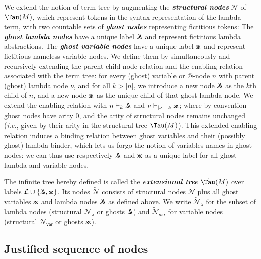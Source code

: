 \documentclass[xchauthor,chkrefs,GCNS,amsmath,amsthm,rotating,leaveRGB]{tcsg}
\renewcommand{\index}[1]{}
\theoremstyle{plain}
\theoremstyle{definition}
\newcommand{\Nodes}{\mathcal{N}}
\newcommand{\NodesVar}{\Nodes_{\mathsf{var}}}
\newcommand{\NodesLmd}{\Nodes_\lambda}
\newcommand{\ExtendedNodes}{\tilde{\Nodes}}
\newcommand{\ExtendedNodesVar}{\tilde{\Nodes}_{\mathsf{var}}}
\newcommand{\ExtendedNodesLmd}{\tilde{\Nodes}_{\lambda}}
\newcommand{\ghostlmd}{{\lambda\mkern-7mu \lambda}}
\newcommand{\ghostvar}{\mathsf{x\mkern-5mu x}}
\newcommand{\enables}{\vdash}
\newcommand{\ctree}{\Tau}
\newcommand{\exttree}{\tilde{\Tau}}
\begin{document}
We extend the notion of term tree by augmenting the \textbf{\emph{structural
nodes}}\index{structural nodes} $\Nodes $ of $\ctree (M)$, which represent
tokens in the syntax representation of the lambda term, with two countable
sets of \textbf{\emph{ghost nodes}}\index{ghost nodes} representing
fictitious tokens: The \textbf{\emph{ghost lambda nodes}}\index{ghost lambda
nodes}  have a unique label $\ghostlmd $ and represent fictitious lambda
abstractions. The \textbf{\emph{ghost variable nodes}}\index{ghost variable
nodes} have a unique label $\ghostvar $ and represent fictitious nameless
variable nodes. We define them by simultaneously and recursively extending
the parent-child node relation and the enabling relation associated with the
term tree: for every (ghost) variable or @-node $n$ with parent (ghost)
lambda node $\nu $, and for all $k>|n|$, we introduce a new node $\ghostlmd $
as the $k$th child of $n$, and a new node $\ghostvar $ as the unique child of
that ghost lambda node. We extend the enabling relation with $n \enables _{k}
\ghostlmd $ and $\nu \enables _{|\nu |+ k} \ghostvar $; where by convention
ghost nodes have arity $0$, and the arity of structural nodes remains
unchanged (\textit{i.e.}, given by their arity in the structural tree $\ctree
(M)$). This extended enabling relation induces a binding relation between
ghost variables and their (possibly ghost) lambda-binder, which lets us forgo
the notion of variables names in ghost nodes: we can thus use respectively
$\ghostlmd $ and $\ghostvar $ as a unique label for all ghost lambda and
variable nodes.

The infinite tree hereby defined is called the \textbf{\emph{extensional
tree}}\index{extensional tree} $\exttree (M)$ over labels $\mathcal{L} \cup
\{ \ghostlmd , \ghostvar \}$. Its nodes $\ExtendedNodes $ consists of
structural nodes $\Nodes $ plus all ghost variables $\ghostvar $ and lambda
nodes $\ghostlmd $ as defined above. We write $\ExtendedNodesLmd $ for the
subset of lambda nodes (structural $\NodesLmd $ or ghosts $\ghostlmd $) and
$\ExtendedNodesVar $ for variable nodes (structural $\NodesVar $ or ghosts
$\ghostvar $).

\subsection{Justified sequence of nodes}\label{sec:justseq}
\end{document}
